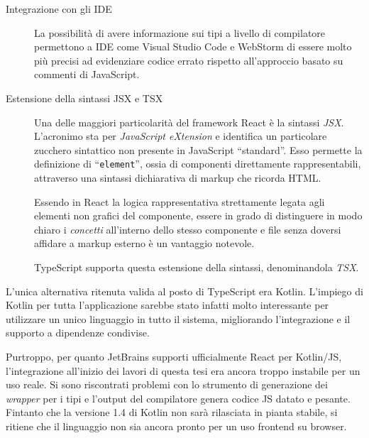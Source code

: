 \begin{description}
        \item[Integrazione con gli IDE]
          La possibilità di avere informazione sui tipi a livello di compilatore permettono a IDE come Visual Studio Code e WebStorm di essere molto più precisi ad evidenziare codice errato rispetto all'approccio basato su commenti di JavaScript.

        \item[Estensione della sintassi JSX e TSX]
          Una delle maggiori particolarità del framework React è la sintassi \emph{JSX}\@.
          L'acronimo sta per \emph{\emph{J}ava\emph{S}cript e\emph{X}tension} e identifica un particolare zucchero sintattico non presente in JavaScript ``standard''.
          Esso permette la definizione di ``\texttt{element}'', ossia di componenti direttamente rappresentabili, attraverso una sintassi dichiarativa di markup che ricorda HTML\@. 

          Essendo in React la logica rappresentativa strettamente legata agli elementi non grafici del componente, essere in grado di distinguere in modo chiaro i \emph{concetti}
          all'interno dello stesso componente e file senza doversi affidare a markup esterno è un vantaggio notevole.

          TypeScript supporta questa estensione della sintassi, denominandola \emph{TSX}.

      \end{description}

      L'unica alternativa ritenuta valida al posto di TypeScript era Kotlin.
      L'impiego di Kotlin per tutta l'applicazione sarebbe stato infatti molto interessante per utilizzare un unico linguaggio in tutto il sistema, migliorando l'integrazione e il supporto a dipendenze condivise.

      Purtroppo, per quanto JetBrains supporti ufficialmente React per Kotlin/JS, l'integrazione all'inizio dei lavori di questa tesi era ancora troppo instabile per un uso reale.
      Si sono riscontrati problemi con lo strumento di generazione dei \emph{wrapper} per i tipi e l'output del compilatore genera codice JS datato e pesante.
      Fintanto che la versione 1.4 di Kotlin non sarà rilasciata in pianta stabile, si ritiene che il linguaggio non sia ancora pronto per un uso frontend su browser.

